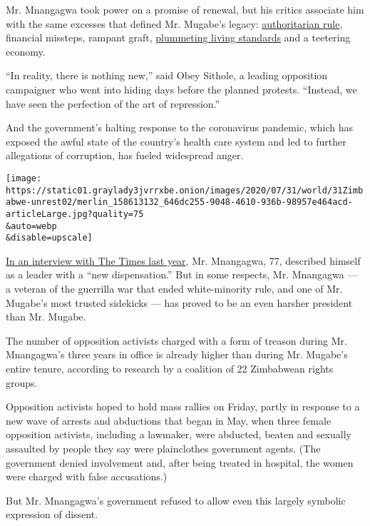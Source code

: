 Mr. Mnangagwa took power on a promise of renewal, but his critics
associate him with the same excesses that defined Mr. Mugabe's legacy:
\href{https://www.nytimes3xbfgragh.onion/2019/01/23/world/africa/zimbabwe-protests-emmerson-mnangagwa.html}{authoritarian
rule}, financial missteps, rampant graft,
\href{https://www.nytimes3xbfgragh.onion/2019/07/31/world/africa/zimbabwe-water-crisis.html}{plummeting
living standards} and a teetering economy.

``In reality, there is nothing new,'' said Obey Sithole, a leading
opposition campaigner who went into hiding days before the planned
protests. ``Instead, we have seen the perfection of the art of
repression.''

And the government's halting response to the coronavirus pandemic, which
has exposed the awful state of the country's health care system and led
to further allegations of corruption, has fueled widespread anger.

\texttt{[image: https://static01.graylady3jvrrxbe.onion/images/2020/07/31/world/31Zimbabwe-unrest02/merlin\_158613132\_646dc255-9048-4610-936b-98957e464acd-articleLarge.jpg?quality=75\\\&auto=webp\\\&disable=upscale]}

\href{https://www.nytimes3xbfgragh.onion/2019/08/10/world/africa/zimbabwe-president-emmerson-mnangagwa-mugabe.html?action=click\&module=RelatedLinks\&pgtype=Article}{In
an interview with The Times last year}, Mr. Mnangagwa, 77, described
himself as a leader with a ``new dispensation.'' But in some respects,
Mr. Mnangagwa --- a veteran of the guerrilla war that ended
white-minority rule, and one of Mr. Mugabe's most trusted sidekicks ---
has proved to be an even harsher president than Mr. Mugabe.

The number of opposition activists charged with a form of treason during
Mr. Mnangagwa's three years in office is already higher than during Mr.
Mugabe's entire tenure, according to research by a coalition of 22
Zimbabwean rights groups.

Opposition activists hoped to hold mass rallies on Friday, partly in
response to a new wave of arrests and abductions that began in May, when
three female opposition activists, including a lawmaker, were abducted,
beaten and sexually assaulted by people they say were plainclothes
government agents. (The government denied involvement and, after being
treated in hospital, the women were charged with false accusations.)

But Mr. Mnangagwa's government refused to allow even this largely
symbolic expression of dissent.

